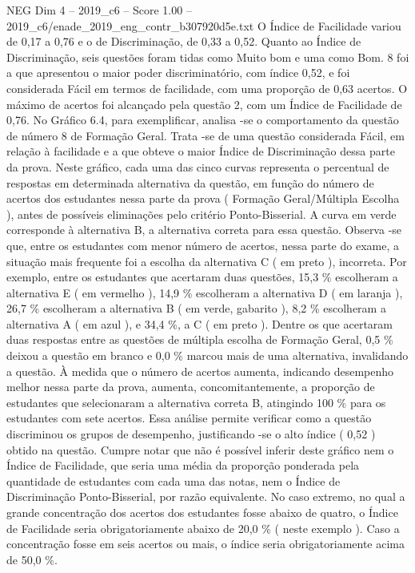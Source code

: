 \begin{textsample}{NEG Dim 4 – 2019\_c6 – Score 1.00 – 2019\_c6/enade\_2019\_eng\_contr\_b307920d5e.txt}
O Índice de Facilidade variou de 0,17 a 0,76 e o de Discriminação, de 0,33 a 0,52.
Quanto ao Índice de Discriminação, seis questões foram tidas como Muito bom e uma como Bom. 8 foi a que apresentou o maior poder discriminatório, com índice 0,52, e foi considerada Fácil em termos de facilidade, com uma proporção de 0,63 acertos.
O máximo de acertos foi alcançado pela questão 2, com um Índice de Facilidade de 0,76.
No Gráfico 6.4, para exemplificar, analisa -se o comportamento da questão de número 8 de Formação Geral.
Trata -se de uma questão considerada Fácil, em relação à facilidade e a que obteve o maior Índice de Discriminação dessa parte da prova.
Neste gráfico, cada uma das cinco curvas representa o percentual de respostas em determinada alternativa da questão, em função do número de acertos dos estudantes nessa parte da prova ( Formação Geral/Múltipla Escolha ), antes de possíveis eliminações pelo critério Ponto-Bisserial.
A curva em verde corresponde à alternativa B, a alternativa correta para essa questão.
Observa -se que, entre os estudantes com menor número de acertos, nessa parte do exame, a situação mais frequente foi a escolha da alternativa C ( em preto ), incorreta.
Por exemplo, entre os estudantes que acertaram duas questões, 15,3 \% escolheram a alternativa E ( em vermelho ), 14,9 \% escolheram a alternativa D ( em laranja ), 26,7 \% escolheram a alternativa B ( em verde, gabarito ), 8,2 \% escolheram a alternativa A ( em azul ), e 34,4 \%, a C ( em preto ).
Dentre os que acertaram duas respostas entre as questões de múltipla escolha de Formação Geral, 0,5 \% deixou a questão em branco e 0,0 \% marcou mais de uma alternativa, invalidando a questão.
À medida que o número de acertos aumenta, indicando desempenho melhor nessa parte da prova, aumenta, concomitantemente, a proporção de estudantes que selecionaram a alternativa correta B, atingindo 100 \% para os estudantes com sete acertos.
Essa análise permite verificar como a questão discriminou os grupos de desempenho, justificando -se o alto índice ( 0,52 ) obtido na questão.
Cumpre notar que não é possível inferir deste gráfico nem o Índice de Facilidade, que seria uma média da proporção ponderada pela quantidade de estudantes com cada uma das notas, nem o Índice de Discriminação Ponto-Bisserial, por razão equivalente.
No caso extremo, no qual a grande concentração dos acertos dos estudantes fosse abaixo de quatro, o Índice de Facilidade seria obrigatoriamente abaixo de 20,0 \% ( neste exemplo ).
Caso a concentração fosse em seis acertos ou mais, o índice seria obrigatoriamente acima de 50,0 \%.

\end{textsample}
